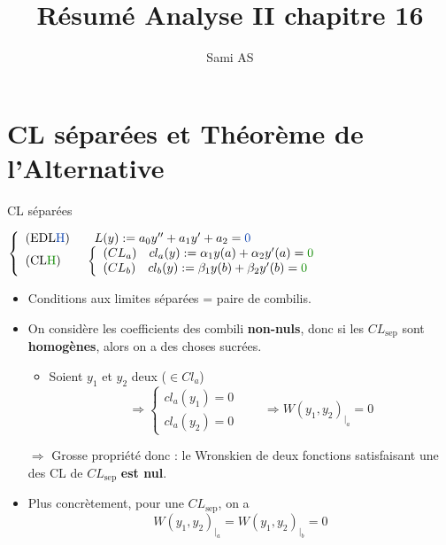 \documentclass[10pt]{beamer}
\author{Sami AS}
\title{Résumé Analyse II chapitre 16}
\newcommand\clsep {CL_\text{sep} }
\begin{document}
\begin{frame}
\titlepage
\end{frame}

\begin{frame}
\tableofcontents
\end{frame}

\section{CL séparées et Théorème de l'Alternative}
\begin{frame}{CL séparées}
\begin{center}
$\left\{ \begin{array}{l}
(\text{EDL\bleu{H}}) \qquad L(y) := a_0 y'' + a_1 y' + a_2 = \bleu{0} \\
(\text{CL\green{H}}) \qquad \left\{\begin{array}{l}
(CL_a) \quad cl_a(y) := \alpha_1 y(a) + \alpha_2 y'(a) = \green{0} \\
(CL_b) \quad cl_b(y) := \beta_1 y(b) + \beta_2 y'(b) = \green{0} 
\end{array}\right.
\end{array} \right.$
\end{center}
\begin{itemize}
\item Conditions aux limites séparées = paire de combilis.
\item On considère les coefficients des combili \textbf{non-nuls}, donc si les $ \clsep$ sont \textbf{homogènes}, alors on a des choses sucrées.
\begin{itemize}
\item Soient $y_1$ et $y_2$ deux  ($\in \mathit{Cl}_a$) $$ \Rightarrow \left\{ \begin{array}{l} 
cl_a(y_1) = 0 \\
cl_a(y_2) = 0 
\end{array}\right.\qquad \Rightarrow W(y_1, y_2)_{\vert_a} = 0$$
\end{itemize} 
\item[$\Rightarrow$] Grosse propriété donc : le Wronskien de deux fonctions satisfaisant une des CL de $\clsep$ \textbf{est nul}.
\item Plus concrètement, pour une $\clsep$, on a  $$W(y_1, y_2)_{\vert_a} =  W(y_1, y_2)_{\vert_b} = 0 $$
\end{itemize}
\end{frame}
\end{document}
